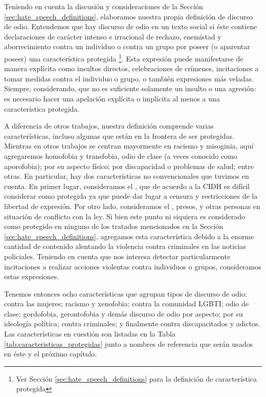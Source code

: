 Teniendo en cuenta la discusión y consideraciones de la Sección \ref{sec:hate_speech_definitions}, elaboramos nuestra propia definición de discurso de odio. Entendemos que hay discurso de odio en un texto social si éste contiene declaraciones de carácter intenso e irracional de rechazo, enemistad y aborrecimiento contra un individuo o contra un grupo por poseer (o aparentar poseer) una característica protegida \footnote{Ver Sección \ref{sec:hate_speech_definitions} para la definición de característica protegida}. Esta expresión puede manifestarse de manera explícita como insultos directos, celebraciones de crímenes, incitaciones a tomar medidas contra el individuo o grupo, o también expresiones más veladas. Siempre, considerando, que no es suficiente solamente un insulto o una agresión: es necesario hacer una apelación explícita o implícita al menos a una característica protegida.

A diferencia de otros trabajos, nuestra definición comprende varias características, incluso algunas que están en la frontera de ser protegidas. Mientras en otros trabajos se centran mayormente en racismo y misoginia, aquí agregaremos homofobia y transfobia, odio de clase (a veces conocido como aporofobia); por su aspecto físico; por discapacidad o problemas de salud; entre otras. En particular, hay dos características no convencionales que tuvimos en cuenta. En primer lugar, consideramos el , que de acuerdo a la CIDH \cite{CIDH2015} es difícil considerar como protegida ya que puede dar lugar a censura y restricciones de la libertad de expresión. Por otro lado, consideramos el , presos, y otras personas en situación de conflicto con la ley. Si bien este punto ni siquiera es considerado como protegido en ninguno de los tratados mencionados en la Sección \ref{sec:hate_speech_definitions}, agregamos esta característica debido a la enorme cantidad de contenido alentando la violencia contra criminales en las noticias policiales. Teniendo en cuenta que nos interesa detectar particularmente incitaciones a realizar acciones violentas contra individuos o grupos, consideramos estas expresiones.

Tenemos entonces ocho características que agrupan tipos de discurso de odio: contra las mujeres; racismo y xenofobia; contra la comunidad LGBTI; odio de clase; gordofobia, gerontofobia y demás discurso de odio por aspecto; por su ideología política; contra criminales; y finalmente contra discapacitados y adictos. Las características en cuestión son listadas en la Tabla \ref{tab:caracteristicas_protegidas} junto a nombres de referencia que serán usados en éste y el próximo capítulo.

